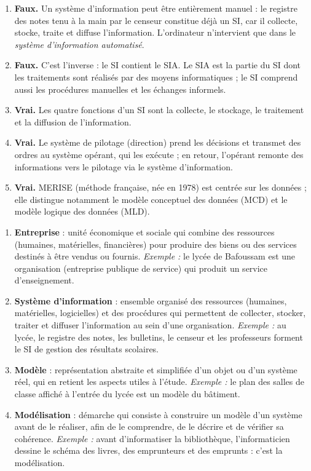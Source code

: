 \documentclass[11pt]{article}
\newcommand{\cle}[1]{{\popxbold\color{popdark}#1}}
\begin{document}
\begin{corrige}
\begin{enumerate}
\item \textbf{Faux.} Un système d'information peut être entièrement manuel : le registre des notes tenu à la main par le censeur constitue déjà un SI, car il collecte, stocke, traite et diffuse l'information. L'ordinateur n'intervient que dans le \emph{système d'information automatisé}.
\item \textbf{Faux.} C'est l'inverse : le SI contient le SIA. Le SIA est la partie du SI dont les traitements sont réalisés par des moyens informatiques ; le SI comprend aussi les procédures manuelles et les échanges informels.
\item \textbf{Vrai.} Les quatre fonctions d'un SI sont la \cle{collecte}, le \cle{stockage}, le \cle{traitement} et la \cle{diffusion} de l'information.
\item \textbf{Vrai.} Le système de pilotage (direction) prend les décisions et transmet des ordres au système opérant, qui les exécute ; en retour, l'opérant remonte des informations vers le pilotage via le système d'information.
\item \textbf{Vrai.} MERISE (méthode française, née en 1978) est centrée sur les données ; elle distingue notamment le modèle conceptuel des données (MCD) et le modèle logique des données (MLD).
\end{enumerate}
\end{corrige}

\begin{corrige}
\begin{enumerate}
\item \textbf{Entreprise} : unité économique et sociale qui combine des ressources (humaines, matérielles, financières) pour produire des biens ou des services destinés à être vendus ou fournis. \emph{Exemple :} le lycée de Bafoussam est une organisation (entreprise publique de service) qui produit un service d'enseignement.
\item \textbf{Système d'information} : ensemble organisé des ressources (humaines, matérielles, logicielles) et des procédures qui permettent de collecter, stocker, traiter et diffuser l'information au sein d'une organisation. \emph{Exemple :} au lycée, le registre des notes, les bulletins, le censeur et les professeurs forment le SI de gestion des résultats scolaires.
\item \textbf{Modèle} : représentation abstraite et simplifiée d'un objet ou d'un système réel, qui en retient les aspects utiles à l'étude. \emph{Exemple :} le plan des salles de classe affiché à l'entrée du lycée est un modèle du bâtiment.
\item \textbf{Modélisation} : démarche qui consiste à construire un modèle d'un système avant de le réaliser, afin de le comprendre, de le décrire et de vérifier sa cohérence. \emph{Exemple :} avant d'informatiser la bibliothèque, l'informaticien dessine le schéma des livres, des emprunteurs et des emprunts : c'est la modélisation.
\end{enumerate}
\end{corrige}
\end{document}
